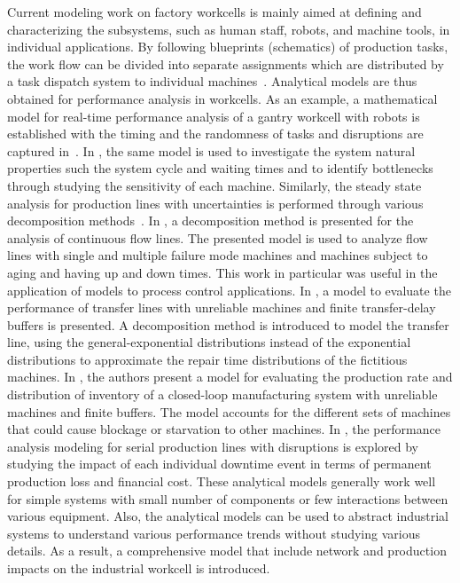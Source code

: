 Current modeling work on factory workcells is mainly aimed at defining and characterizing the subsystems, such as human staff, robots, and machine tools, in individual applications. By following blueprints (schematics) of production tasks, the work flow can be divided into separate assignments which are distributed by a task dispatch system to individual machines~\cite{IkeaBot}. Analytical models are thus obtained for performance analysis in workcells. As an example, a mathematical model for real-time performance analysis of a gantry workcell with robots is established with the timing and the randomness of tasks and disruptions are captured in~\cite{8098604}. In \cite{Ou2017}, the same model is used to investigate the system natural properties such the system cycle and waiting times and to identify bottlenecks through studying the sensitivity of each machine. Similarly, the steady state analysis for production lines with uncertainties is performed through various decomposition methods~\cite{Colledani2013,doi:10.1080/00207543.2012.713137,doi:10.1080/00207540500385980}. In \cite{Colledani2013}, a decomposition method is presented for the analysis of continuous flow lines. The presented model is used to analyze flow lines with single and multiple failure mode machines and machines subject to aging and having up and down times.  This work in particular was useful in the application of models to process control applications. In \cite{doi:10.1080/00207543.2012.713137}, a model to evaluate the performance of transfer lines with unreliable machines and finite transfer-delay buffers is presented. A decomposition method is introduced to model the transfer line, using the general-exponential distributions instead of the exponential distributions to approximate the repair time distributions of the fictitious machines. In \cite{doi:10.1080/00207540500385980}, the authors present a model for evaluating the production rate and distribution of inventory of a closed-loop manufacturing system with unreliable machines and finite buffers. The model accounts for the different sets of machines that could cause blockage or starvation to other machines. In \cite{QChang,Liu2012}, the performance analysis modeling for serial production lines with disruptions is explored by studying the impact of each individual downtime event in terms of permanent production loss and financial cost. These analytical models generally work well for simple systems with small number of components or few interactions between various equipment. Also, the analytical models can be used to abstract industrial systems to understand various performance trends without studying various details. As a result, a comprehensive model that include network and production impacts on the industrial workcell is introduced.  

